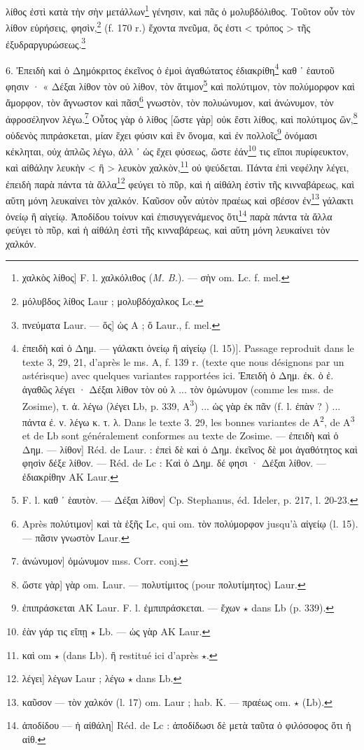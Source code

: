 \documentclass[a4paper, 11pt, oneside, polutonikogreek, french]{article}
\begin{document}
λίθος ἐστὶ κατὰ τὴν σὴν μετάλλων\footnote{χαλκὸς λίθος] F. l. χαλκόλιθος (\emph{M. B.}). --- σὴν om. Lc. f. mel.} γένησιν, καὶ πᾶς ὁ μολυβδόλιθος. Τοῦτον οὖν τὸν λίθον εὑρήσεις, φησὶν,\footnote{μόλυβδος λίθος Laur ; μολυβδόχαλκος Lc.} (f. 170 r.) ἔχοντα πνεῦμα, ὅς ἐστι < τρόπος > τῆς ἐξυδραργυρώσεως.\footnote{πνεύματα Laur. --- ὅς] ὡς A ; ὅ Laur., f. mel.}

 

6. Ἐπειδὴ καὶ ὁ Δημόκριτος ἐκεῖνος ὁ ἐμοὶ ἀγαθώτατος ἐδιακρίθη\footnote{ἐπειδὴ καὶ ὁ Δημ. --- γάλακτι ὀνείῳ ἢ αἰγείῳ (l. 15)]. Passage reproduit dans le texte 3, 29, 21, d'après le ms. A, f. 139 r. (texte que nous désignons par un astérisque) avec quelques variantes rapportées ici. Ἐπειδὴ ὁ Δημ. ἐκ. ὁ ἐ. ἀγαθῶς λέγει · Δέξαι λίθον τὸν οὐ λ ... τὸν ὀμώνυμον (comme les mss. de Zosime), τ. ἀ. λέγω (λέγει Lb, p. 339, A\textsuperscript{3}) ... ὡς γὰρ ἐκ πᾶν (f. l. ἐπὰν ? ) ... πάντα ἐ. ν. λέγω κ. τ. λ. Dans le texte 3. 29, les bonnes variantes de A\textsuperscript{2}, de A\textsuperscript{3} et de Lb sont généralement conformes au texte de Zosime. --- ἐπειδὴ καὶ ὁ Δημ. --- λίθον] Réd. de Laur. : ἐπεὶ δὲ καὶ ὁ Δημ. ἐκεῖνος δὲ μοι ἀγαθότητος καὶ φησὶν δέξε λίθον. --- Réd. de Lc : Καὶ ὁ Δημ. δέ φησι · Δέξαι λίθον. --- ἐδιακρίθην AK Laur.} καθ ᾽ ἑαυτοῦ φησιν · « Δέξαι λίθον τὸν οὐ λίθον, τὸν ἄτιμον\footnote{F. l. καθ ᾽ ἑαυτὸν. --- Δέξαι λίθον] Cp. Stephanus, éd. Ideler, p. 217, l. 20-23.} καὶ πολύτιμον, τὸν πολύμορφον καὶ ἄμορφον, τὸν ἄγνωστον καὶ πᾶσι\footnote{Après πολύτιμον] καὶ τὰ ἑξῆς Lc, qui om. τὸν πολύμορφον jusqu'à αἰγείῳ (l. 15). --- πᾶσιν γνωστὸν Laur.} γνωστὸν, τὸν πολυώνυμον, καὶ ἀνώνυμον, τὸν ἀφροσέληνον λέγω.\footnote{ἀνώνυμον] ὁμώνυμον mss. Corr. conj.} Οὗτος γὰρ ὁ λίθος [ὥστε γὰρ] οὐκ ἔστι λίθος, καὶ πολύτιμος ὢν,\footnote{ὥστε γὰρ] γὰρ om. Laur. --- πολυτίμιτος (pour πολυτίμητος) Laur.} οὐδενὸς πιπράσκεται, μίαν ἔχει φύσιν καὶ ἓν ὄνομα, καὶ ἐν πολλοῖς\footnote{ἐπιπράσκεται AK Laur. F. l. ἐμπιπράσκεται. --- ἔχων $\star$ dans Lb (p. 339).} ὀνόμασι κέκληται, οὐχ ἁπλῶς λέγω, ἀλλ ᾽ ὡς ἔχει φύσεως, ὥστε ἐάν\footnote{ἐὰν γάρ τις εἴπῃ $\star$ Lb. --- ὡς γὰρ AK Laur.} τις εἴποι πυρίφευκτον, καὶ αἰθάλην λευκὴν < ἢ > λευκὸν χαλκὸν,\footnote{καὶ om $\star$ (dans Lb). ἢ restitué ici d'après $\star$.} οὐ ψεύδεται. Πάντα ἐπὶ νεφέλην λέγει, ἐπειδὴ παρὰ πάντα τὰ ἄλλα\footnote{λέγει] λέγων Laur ; λέγω $\star$ dans Lb.} φεύγει τὸ πῦρ, καὶ ἡ αἰθάλη ἐστὶν τῆς κινναβάρεως, καὶ αὕτη μόνη λευκαίνει τὸν χαλκόν. Καῦσον οὖν αὐτὸν πραέως καὶ σβέσον ἐν\footnote{καῦσον --- τὸν χαλκόν (l. 17) om. Laur ; hab. K. --- πραέως om. $\star$ (Lb).} γάλακτι ὀνείῳ ἢ αἰγείῳ. Ἀποδίδου τοίνυν καὶ ἐπισυγγενάμενος ὅτι\footnote{ἀποδίδου --- ἡ αἰθάλη] Réd. de Lc : ἀποδίδωσι δὲ μετὰ ταῦτα ὁ φιλόσοφος ὅτι ἡ αἰθ.} παρὰ πάντα τὰ ἄλλα φεύγει τὸ πῦρ, καὶ ἡ αἰθάλη ἐστὶ τῆς κινναβάρεως, καὶ αὕτη μόνη λευκαίνει τὸν χαλκόν.
\end{document}
